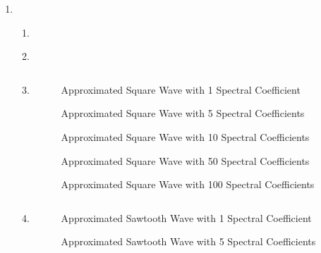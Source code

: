 \documentclass[10pt,a4paper, margin=1in]{article}
\begin{document}
\begin{enumerate}
\item \begin{enumerate}
    \item \inputminted{python}{q8a.py}
    \item \inputminted{python}{q8b.py}
    \item \inputminted{python}{q8c.py}
    \begin{figure}[H]
        \centering
        \caption{Approximated Square Wave with 1 Spectral Coefficient}
        
    \end{figure}
    \begin{figure}[H]
        \centering
        \caption{Approximated Square Wave with 5 Spectral Coefficients}
        
    \end{figure}
    \begin{figure}[H]
        \centering
        \caption{Approximated Square Wave with 10 Spectral Coefficients}
        
    \end{figure}
    \begin{figure}[H]
        \centering
        \caption{Approximated Square Wave with 50 Spectral Coefficients}
        
    \end{figure}
    \begin{figure}[H]
        \centering
        \caption{Approximated Square Wave with 100 Spectral Coefficients}
        
    \end{figure}
    \item \inputminted{python}{q8d.py}
    \begin{figure}[H]
        \centering
        \caption{Approximated Sawtooth Wave with 1 Spectral Coefficient}
        
    \end{figure}
    \begin{figure}[H]
        \centering
        \caption{Approximated Sawtooth Wave with 5 Spectral Coefficients}
        
    \end{figure}
    \begin{figure}[H]
        \centering

\end{figure}
\end{enumerate}
\end{enumerate}
\end{document}
